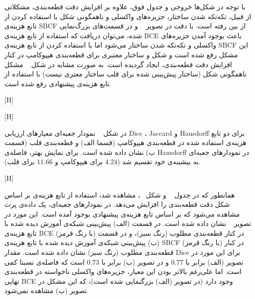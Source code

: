 با توجه در شکل‌ها خروجی و جدول فوق، علاوه بر افزایش دقت قطعه‌بندی، مشکلاتی از قبیل، تکه‌تکه شدن ساختار، جزیره‌های واکسلی و ناهمگونی شکل با استفاده کردن از تابع هزینه‌ی SBCF از بین رفته است. با دقت در تصویر ~ و در قسمت‌های بزرگ‌نمایی شده، می‌‌توان دریافت که استفاده از تابع هزینه‌ی BCE باعث بوجود آمدن جزیره‌های واکسلی و تکه‌‌تکه شدن ساختار می‌شود اما با استفاده کردن از تابع هزینه‌ی SBCF این مشکل رفع شده است و شکل و ساختار معتبری برای قطعه‌بندی هیپوکامپ در کنار افزایش دقت قطعه‌بندی، ایجاد گردیده است. به صورت مشابه در شکل ~ مشکل ناهمگونی شکل (ساختار پیش‌بینی شده برای قلب ساختار معتری نیست) با استفاده از تابع هزینه‌ی پیشنهادی رفع شده است.

[H]

[H]

در شکل ~ نمودار جعبه‌ای معیار‌های ارزیابی  Dice ، Jaccard و Hausdorff برای دو تابع هزینه‌ی استفاده شده در قطعه‌بندی هیپوکامپ (قسما الف) و قطعه‌بندی قلب (قسمت ب) نشان داده شده است. برای نمایش بهتر، فاصله‌ی Hausdorff در نمودارهای جعبه‌ای به بیشینه‌ی خود تقسیم شد ($4.24$ برای هیپوکامپ و $11.66$ برای قلب).

[H]

همانطور که در جدول ~ و شکل ~، مشاهده شد، استفاده از تابع هزینه‌ی بر اساس شکل دقت قطعه‌بندی را افزایش می‌دهد. در نمودارهای جعبه‌ای، یک داده‌ی پرت مشاهده می‌شود که بر اساس تابع هزینه‌ی پیشنهادی بوجود آمده است. این مورد در تصویر ~ نشان داده شده است. در قسمت (الف) پیش‌بینی شبکه‌ی آموزش دیده شده با تابع هزینه‌ی BCE (با رنگ قرمز) در کنار قطعه‌بندی مطلوب (رنگ سبز)، و در قسمت (ب) پیش‌بینی شبکه‌ی آموزش دیده شده با تابع هزینه‌ی SBCF (با رنگ قرمز) در کنار قطعه‌بندی مطلوب (رنگ سبز) نشان داده شده است. مقدار Dice برای این مورد در تصویر (الف) برابر با $0.77$ و در تصویر (ب) برابر با $0.73$ است که فاصله‌ی نسبتا کمی است. اما علی‌رغم بالاتر بودن این معیار، جزیره‌های واکسلی ناخواسته در قطعه‌بندی نهایی BCE وجود دارد (در تصویر (الف) بزرگنمایی شده است)، که این مشکل در تصویر (ب) مشاهده نمی‌شود.

